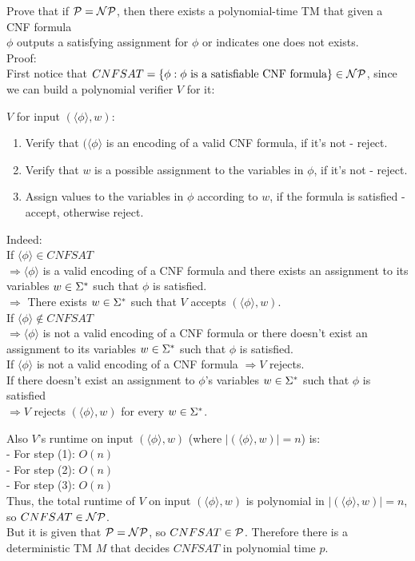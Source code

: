 Prove that if $\mathcal{P} = \mathcal{N}\mathcal{P}$, then there exists a polynomial-time TM that given a CNF formula \\
$\phi$ outputs a satisfying assignment for $\phi$ or indicates one does not exists. \\

Proof: \\
First notice that $CNFSAT = \{\phi: \phi \text{ is a satisfiable CNF formula}\} \in \mathcal{N}\mathcal{P}$,
since we can build a polynomial verifier $V$ for it:

$V$ for input $(\langle \phi \rangle, w)$:
\begin{enumerate}[1., itemsep=5pt]
    \item Verify that $(\langle \phi \rangle$ is an encoding of a valid CNF formula, if it's not - reject.

    \item Verify that $w$ is a possible assignment to the variables in $\phi$, if it's not - reject.

    \item Assign values to the variables in $\phi$ according to $w$, if the formula is satisfied - accept, otherwise reject.

\end{enumerate}

Indeed: \\
If $\langle \phi \rangle \in CNFSAT$ \\
$\Rightarrow \langle \phi \rangle$ is a valid encoding of a CNF formula
and there exists an assignment to its variables $w \in \Sigma^*$ such that $\phi$ is satisfied. \\
$\Rightarrow $ There exists $w \in \Sigma^*$ such that $V$ accepts $(\langle \phi \rangle, w)$. \\

If $\langle \phi \rangle \notin CNFSAT$ \\
$\Rightarrow \langle \phi \rangle$ is not a valid encoding of a CNF formula
or there doesn't exist an assignment to its variables $w \in \Sigma^*$ such that $\phi$ is satisfied. \\
If $\langle \phi \rangle$ is not a valid encoding of a CNF formula $\Rightarrow V$ rejects. \\
If there doesn't exist an assignment to $\phi$'s variables $w \in \Sigma^*$ such that $\phi$ is satisfied \\
$\Rightarrow V$ rejects $(\langle \phi \rangle, w)$ for every $w \in \Sigma^*$.

Also $V$'s runtime on input $(\langle \phi \rangle, w)$ (where $|(\langle \phi \rangle, w)|=n$) is: \\
- For step (1): $O(n)$ \\
- For step (2): $O(n)$ \\
- For step (3): $O(n)$ \\
Thus, the total runtime of $V$ on input  $(\langle \phi \rangle, w)$ is polynomial in $|(\langle \phi \rangle, w)|=n$, so $CNFSAT \in \mathcal{N}\mathcal{P}$. \\
But it is given that $\mathcal{P} = \mathcal{N}\mathcal{P}$, so $CNFSAT \in \mathcal{P}$.
Therefore there is a deterministic TM $M$ that decides $CNFSAT$ in polynomial time $p$. \\

